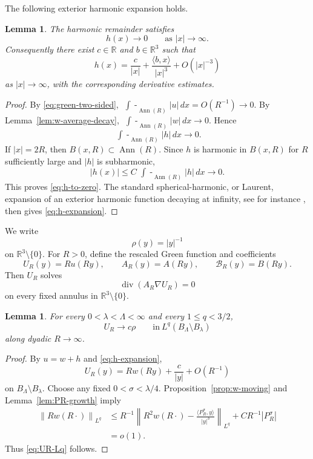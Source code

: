 \documentclass[11pt]{amsart}
\numberwithin{equation}{section}
\newtheorem{lemma}[theorem]{Lemma}
\theoremstyle{definition}
\newcommand{\R}{\mathbb R}
\newcommand{\divE}{\operatorname{div}}
\newcommand{\Ann}{\operatorname{Ann}}
\newcommand{\fint}{\mathop{\!\!\int\!\!\!\!-}\nolimits}
\newcommand{\rhoE}{\rho}
\newcommand{\ip}[2]{\langle #1,#2\rangle}
\newcommand{\norm}[1]{\left\lVert #1\right\rVert}
\newcommand{\abs}[1]{\left\lvert #1\right\rvert}
\begin{document}
The following exterior harmonic expansion holds.
\begin{lemma}\label{lem:h-expansion}
The harmonic remainder satisfies
\begin{equation}\label{eq:h-to-zero}
        h(x)\to0\qquad\text{as }\abs{x}\to\infty.
\end{equation}
Consequently there exist $c\in\R$ and $b\in\R^3$ such that
\begin{equation}\label{eq:h-expansion}
        h(x)=\frac{c}{\abs x}+\frac{\ip{b}{x}}{\abs x^3}+O(\abs x^{-3})
\end{equation}
as $\abs x\to\infty$, with the corresponding derivative estimates.
\end{lemma}

\begin{proof}
By \eqref{eq:green-two-sided}, $\fint_{\Ann(R)}\abs u\,dx=O(R^{-1})\to0$.  By Lemma~\ref{lem:w-average-decay}, $\fint_{\Ann(R)}\abs w\,dx\to0$.  Hence
$$
        \fint_{\Ann(R)}\abs h\,dx\to0.
$$
If $\abs{x}=2R$, then $B(x,R)\subset \Ann(R)$.  Since $h$ is harmonic in $B(x,R)$ for $R$ sufficiently large and $\abs h$ is subharmonic,
$$
        \abs{h(x)}\le C\fint_{\Ann(R)}\abs h\,dx\to0.
$$
This proves \eqref{eq:h-to-zero}.  The standard spherical-harmonic, or Laurent, expansion of an exterior harmonic function decaying at infinity, see for instance \cite[Chapter~5]{ABR}, then gives \eqref{eq:h-expansion}.
\end{proof}

We write
$$
        \rhoE(y)=\abs y^{-1}
$$
on $\R^3\setminus\{0\}$.  For $R>0$, define the rescaled Green function and coefficients
$$
        U_R(y)=Ru(Ry),\qquad A_R(y)=A(Ry),\qquad \mathcal B_R(y)=B(Ry).
$$
Then $U_R$ solves
\begin{equation}\label{eq:UR-equation}
        \divE(A_R\nabla U_R)=0
\end{equation}
on every fixed annulus in $\R^3\setminus\{0\}$.

\begin{lemma}\label{lem:UR-Lq}
For every $0<\lambda<\Lambda<\infty$ and every $1\le q<3/2$,
\begin{equation}\label{eq:UR-Lq}
        U_R\to c\rhoE \qquad \text{in} \ L^q(B_\Lambda\setminus B_\lambda)
\end{equation}
 along dyadic $R\to\infty$.
\end{lemma}

\begin{proof}
By $u=w+h$ and \eqref{eq:h-expansion},
$$
        U_R(y)=Rw(Ry)+\frac{c}{\abs y}+O(R^{-1})
$$
on $B_\Lambda\setminus B_\lambda$.  Choose any fixed $0<\sigma<\lambda/4$.  Proposition~\ref{prop:w-moving} and Lemma~\ref{lem:PR-growth} imply
$$
\begin{aligned}
        \norm{Rw(R\cdot)}_{L^q}
        &\le R^{-1}\left\|R^2w(R\cdot)-\frac{\ip{P_R^\sigma}{y}}{\abs y^3}\right\|_{L^q}
        +CR^{-1}\abs{P_R^\sigma}  \\
        &=o(1).
\end{aligned}
$$
Thus \eqref{eq:UR-Lq} follows.
\end{proof}
\end{document}
